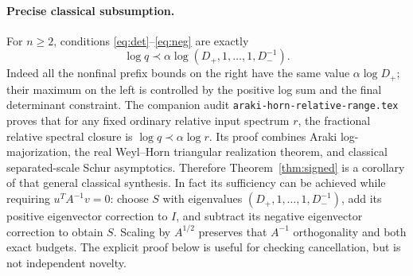 \documentclass[11pt]{article}
\begin{document}
\paragraph{Precise classical subsumption.}
For $n\ge2$, conditions \eqref{eq:det}--\eqref{eq:neg} are exactly
\[
 \log q\prec\alpha\log(D_+,1,\ldots,1,D_-^{-1}).
\]
Indeed all the nonfinal prefix bounds on the right have the same value
$\alpha\log D_+$; their maximum on the left is controlled by the
positive log sum and the final determinant constraint. The companion audit
\texttt{araki-horn-relative-range.tex} proves that for any fixed ordinary
relative input spectrum $r$, the fractional relative spectral closure is
$\log q\prec\alpha\log r$. Its proof combines Araki log-majorization,
the real Weyl--Horn triangular realization theorem, and classical
separated-scale Schur asymptotics. Therefore Theorem~\ref{thm:signed}
is a corollary of that general classical synthesis. In fact its
sufficiency can be achieved while requiring $u^TA^{-1}v=0$: choose
$S$ with eigenvalues $(D_+,1,\ldots,1,D_-^{-1})$, add its positive
eigenvector correction to $I$, and subtract its negative eigenvector
correction to obtain $S$. Scaling by $A^{1/2}$ preserves that
$A^{-1}$ orthogonality and both exact budgets. The explicit proof below
is useful for checking cancellation, but is not independent novelty.
\end{document}
